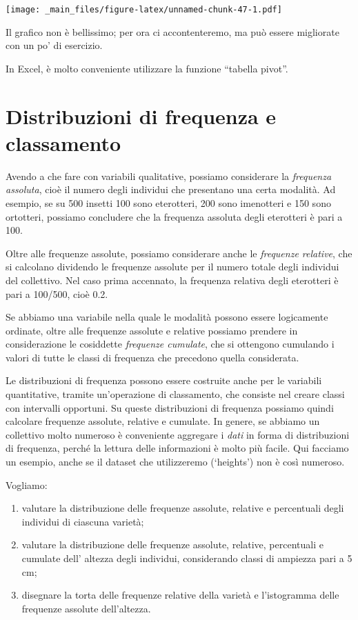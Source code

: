 \documentclass[a4paper,12pt,oneside]{book}
\providecommand{\tightlist}{%
  \setlength{\itemsep}{0pt}\setlength{\parskip}{0pt}}
\begin{document}
\texttt{[image: \_main\_files/figure-latex/unnamed-chunk-47-1.pdf]}

Il grafico non è bellissimo; per ora ci accontenteremo, ma può essere
migliorate con un po' di esercizio.

In Excel, è molto conveniente utilizzare la funzione ``tabella pivot''.

\section{Distribuzioni di frequenza e
classamento}\label{distribuzioni-di-frequenza-e-classamento}

Avendo a che fare con variabili qualitative, possiamo considerare la
\emph{frequenza assoluta}, cioè il numero degli individui che presentano
una certa modalità. Ad esempio, se su 500 insetti 100 sono eterotteri,
200 sono imenotteri e 150 sono ortotteri, possiamo concludere che la
frequenza assoluta degli eterotteri è pari a 100.

Oltre alle frequenze assolute, possiamo considerare anche le
\emph{frequenze relative}, che si calcolano dividendo le frequenze
assolute per il numero totale degli individui del collettivo. Nel caso
prima accennato, la frequenza relativa degli eterotteri è pari a
100/500, cioè 0.2.

Se abbiamo una variabile nella quale le modalità possono essere
logicamente ordinate, oltre alle frequenze assolute e relative possiamo
prendere in considerazione le cosiddette \emph{frequenze cumulate}, che
si ottengono cumulando i valori di tutte le classi di frequenza che
precedono quella considerata.

Le distribuzioni di frequenza possono essere costruite anche per le
variabili quantitative, tramite un'operazione di classamento, che
consiste nel creare classi con intervalli opportuni. Su queste
distribuzioni di frequenza possiamo quindi calcolare frequenze assolute,
relative e cumulate. In genere, se abbiamo un collettivo molto numeroso
è conveniente aggregare i \emph{dati} in forma di distribuzioni di
frequenza, perché la lettura delle informazioni è molto più facile. Qui
facciamo un esempio, anche se il dataset che utilizzeremo (`heights')
non è così numeroso.

Vogliamo:

\begin{enumerate}
\def\labelenumi{\arabic{enumi}.}
\tightlist
\item
  valutare la distribuzione delle frequenze assolute, relative e
  percentuali degli individui di ciascuna varietà;
\item
  valutare la distribuzione delle frequenze assolute, relative,
  percentuali e cumulate dell' altezza degli individui, considerando
  classi di ampiezza pari a 5 cm;
\item
  disegnare la torta delle frequenze relative della varietà e
  l'istogramma delle frequenze assolute dell'altezza.
\end{enumerate}
\end{document}
